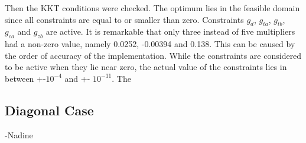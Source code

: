 Then the KKT conditions were checked. The optimum lies in the feasible domain since all constraints are equal to or smaller than zero. Constraints $g_d$, $g_{ta}$, $g_{tb}$,\\ $g_{ca}$ and $g_{zb}$ are active.  It is remarkable that only three instead of five multipliers had a non-zero value, namely 0.0252, -0.00394 and 0.138. This can be caused by the order of accuracy of the implementation. While the constraints are considered to be active when they lie near zero, the actual value of the constraints lies in between +-$10^{-4}$ and +- $10^{-11}$. The 


\subsection{Diagonal Case}
-Nadine
